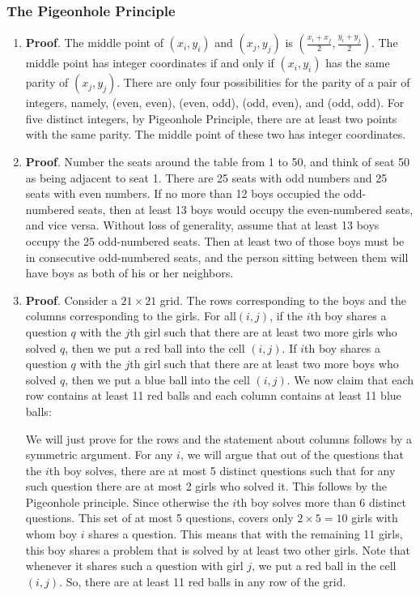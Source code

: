 \documentclass{sig-alternate-05-2015}
\begin{document}
\subsubsection{The Pigeonhole Principle}
\begin{enumerate}
	\item \textbf{Proof}. The middle point of $(x_i, y_i)$ and $(x_j, y_j)$ is $(\frac{x_i + x_j}{2}, \frac{y_i + y_j}{2})$. The middle point has integer coordinates if and only if $(x_i, y_i)$ has the same parity of $(x_j, y_j)$.  There are only
	four possibilities for the parity of a pair of integers, namely, (even, even), (even, odd),
	(odd, even), and (odd, odd). For five distinct integers, by Pigeonhole Principle, there
	are at least two points with the same parity. The middle point of these two has integer
	coordinates.
	
	\item \textbf{Proof}. Number the seats around the table
	from 1 to 50, and think of seat 50 as being adjacent to seat 1.
	There are 25 seats with odd numbers and 25 seats with even
	numbers. If no more than 12 boys occupied the odd-numbered seats, then at least 13 boys would occupy the even-numbered
	seats, and vice versa. Without loss of generality, assume that
	at least 13 boys occupy the 25 odd-numbered seats. Then at
	least two of those boys must be in consecutive odd-numbered
	seats, and the person sitting between them will have boys as
	both of his or her neighbors.
	
	\item \textbf{Proof}. Consider a $21 \times 21$ grid. The rows corresponding to the boys and the columns corresponding to the girls. For all$(i, j)$, if the	$i$th boy shares a question $q$ with the $j$th girl	such that there are at least two more girls who solved $q$, then we put a red ball into the	cell $(i, j)$. If $i$th boy shares a question $q$ with the $j$th girl such that there are at least two more boys who solved	$q$, then we put a blue ball into the cell $(i, j)$.  We now claim that each row contains at least 11 red balls and each column contains at least 11 blue balls:

	We will just prove for the rows and the statement about columns follows by a symmetric argument. For any $i$, we will argue that out of the questions that the $i$th	boy	solves, there are at most 5 distinct questions such that for any such question there are at most 2 girls who solved it. This follows by the Pigeonhole principle. Since otherwise the $i$th boy solves more than 6 distinct questions. This set of at most 5 questions, covers only
	$2 \times 5 = 10$ girls with whom boy $i$ shares a question.  This means that with the remaining 11 girls, this boy shares a problem that is solved by at least two other girls. Note that
	whenever it shares such a question with girl $j$, we put a red ball in the cell $(i, j)$. So, there are at least 11 red balls in any row of the grid.
	

\end{enumerate}
\end{document}
